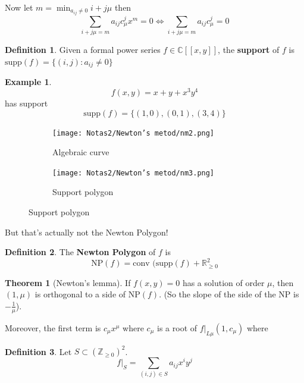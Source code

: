 \documentclass{article}
\theoremstyle{definition}
\newtheorem*{thm*}{Theorem}
\newtheorem*{defn}{Definition}
\newtheorem{ex}{Example}
\newcommand{\R}{\mathbb{R}}
\newcommand{\Z}{\mathbb{Z}}
\newcommand{\C}{\mathbb{C}}
\newcommand{\conv}{\text{conv }}
\newcommand{\NP}{\text{NP}}
\newcommand{\supp}{\text{supp}}
\begin{document}
Now let $m=\min_{a_{ij}\neq0}i+j\mu$
then
$$\sum_{i+j\mu=m}a_{ij}c_\mu^jx^m=0\iff \sum_{i+j\mu=m}a_{ij}c_\mu^j=0$$
\begin{defn}
    Given a formal power series $f\in\C[[x,y]]$, the \textbf{support} of $f$ is $\supp(f)=\{(i,j):a_{ij}\neq0\}$
\end{defn}
\begin{ex}
    $$f(x,y)=x+y+x^3y^4$$
    has support
    $$\supp(f)=\{(1,0),(0,1),(3,4)\}$$
	\begin{figure}[H]
		\begin{subfigure}{.4\textwidth}
			\centering
			\texttt{[image: Notas2/Newton's metod/nm2.png]}
			\caption*{Algebraic curve}
		\end{subfigure}
		\begin{subfigure}{.4\textwidth}
			\centering
			\texttt{[image: Notas2/Newton's metod/nm3.png]}
			\caption*{Support polygon}
		\end{subfigure}
	\end{figure}
\end{ex}

But that's actually not the Newton Polygon!
\begin{defn}
    The \textbf{Newton Polygon} of $f$ is $$\NP(f)=\conv(\supp(f)+\R_{\geq0}^2$$
\end{defn}
\begin{thm*}[Newton's lemma]
    If $f(x,y)=0$ has a solution of order $\mu$, then $(1,\mu)$ is orthogonal to a side of $\NP(f)$. (So the slope of the side of the NP is $-\frac{1}{\mu}$).\par
    Moreover, the first term is $c_\mu x^\mu$ where $c_\mu$ is a root of $f|_{L\mu}(1,c_\mu)$ where
\end{thm*}
\begin{defn}
    Let $S\subset(\Z_{\geq0})^2$.
    $$f|_S=\sum_{(i,j)\in S} a_{ij}x^iy^j$$
\end{defn}
\end{document}
